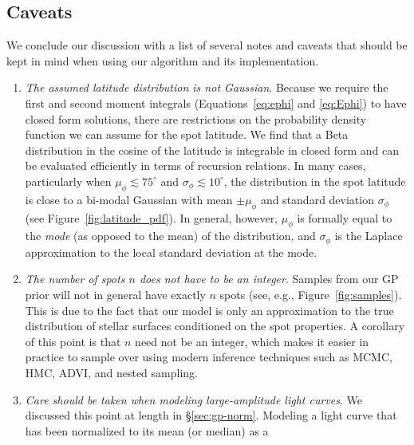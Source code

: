 \documentclass[modern,linenumbers]{aastex62}
\begin{document}
\vfill
\pagebreak

\subsection{Caveats}
\label{sec:caveats}

We conclude our discussion with a list of several notes and caveats that should be kept
in mind when using our algorithm and its \Python implementation.

\begin{enumerate}
    \item \emph{The assumed latitude distribution is not Gaussian}.
          Because we require the first and second moment integrals
          (Equations~\ref{eq:ephi} and \ref{eq:Ephi}) to have closed
          form solutions, there are restrictions on the probability
          density function we can assume for the spot latitude.
          We find that a Beta distribution in the cosine of the latitude
          is integrable in closed form and can be evaluated efficiently
          in terms of recursion relations. In many cases, particularly
          when $\mu_\phi \lesssim 75^\circ$ and $\sigma_\phi \lesssim 10^\circ$,
          the distribution in the spot latitude
          is close to a bi-modal Gaussian with mean $\pm\mu_\phi$ and
          standard deviation $\sigma_\phi$ (see Figure~\ref{fig:latitude_pdf}).
          In general, however, $\mu_\phi$ is formally equal to the \emph{mode}
          (as opposed to the mean) of the distribution, and $\sigma_\phi$ is
          the Laplace approximation to the local standard deviation at the mode.
    \item \emph{The number of spots $n$ does not have to be an integer}.
          Samples from our GP prior will not in general have exactly $n$
          spots (see, e.g., Figure~\ref{fig:samples}). This is due to the fact
          that our model is only an approximation to the true distribution
          of stellar surfaces conditioned on the spot properties. A corollary
          of this point is that $n$ need not be an integer, which makes it
          easier in practice to sample over using modern inference
          techniques such as MCMC, HMC, ADVI, and nested sampling.
    \item \emph{Care should be taken when modeling large-amplitude light curves}.
          We discussed this point at length in \S\ref{sec:gp-norm}. Modeling
          a light curve that has been normalized to its mean (or median) as a

\end{enumerate}
\end{document}
